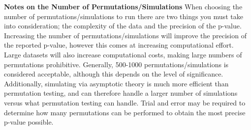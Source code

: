 \documentclass[
]{article}
\begin{document}
\textbf{Notes on the Number of Permutations/Simulations} When choosing
the number of permutations/simulations to run there are two things you
must take into consideration; the complexity of the data and the
precision of the p-value. Increasing the number of
permutations/simulations will improve the precision of the reported
p-value, however this comes at increasing computational effort. Large
datasets will also increase computational costs, making large numbers of
permutations prohibitive. Generally, 500-1000 permutations/simulations
is considered acceptable, although this depends on the level of
significance. Additionally, simulating via asymptotic theory is much
more efficient than permutation testing, and can therefore handle a
larger number of simulations versus what permutation testing can handle.
Trial and error may be required to determine how many permutations can
be performed to obtain the most precise p-value possible.
\end{document}
